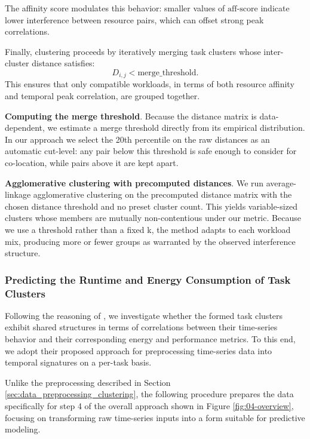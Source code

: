 The affinity score modulates this behavior:
smaller values of \( \mathrm{aff\text{-}score} \)
indicate lower interference between resource pairs,
which can offset strong peak correlations.

Finally, clustering proceeds by iteratively merging task clusters
whose inter-cluster distance satisfies:
\[
    D_{i,j} < \text{merge\_threshold}.
\]
This ensures that only compatible workloads, in terms of both
resource affinity and temporal peak correlation, are grouped together.

\textbf{Computing the merge threshold}. Because the distance matrix is data-dependent, we estimate a merge threshold directly from its empirical distribution. In our approach we select the 20th percentile on the raw distances as an automatic cut-level: any pair below this threshold is safe enough to consider for co-location, while pairs above it are kept apart.

\textbf{Agglomerative clustering with precomputed distances}. We run average-linkage agglomerative clustering on the precomputed distance matrix with the chosen distance threshold and no preset cluster count. This yields variable-sized clusters whose members are mutually non-contentious under our metric. Because we use a threshold rather than a fixed k, the method adapts to each workload mix, producing more or fewer groups as warranted by the observed interference structure.

\subsubsection{Predicting the Runtime and Energy Consumption of Task Clusters}
\label{sec:prediciton_kcca_rfr}

Following the reasoning of \cite{5644899}, we investigate whether the formed task clusters exhibit shared structures in terms of correlations between their time-series behavior and their corresponding energy and performance metrics. To this end, we adopt their proposed approach for preprocessing time-series data into temporal signatures on a per-task basis.

\label{sec:data_preprocessing_predictive}

Unlike the preprocessing described in Section \ref{sec:data_preprocessing_clustering}, the following procedure prepares the data specifically for step 4 of the overall approach shown in Figure \ref{fig:04-overview}, focusing on transforming raw time-series inputs into a form suitable for predictive modeling.

